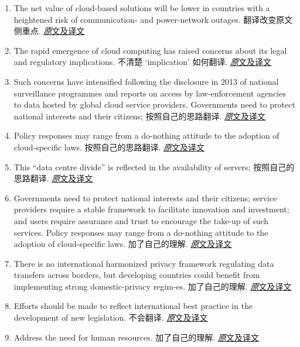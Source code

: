 \documentclass[a4paper, UTF8, 12pt]{article}
\begin{document}
\begin{enumerate}
    \item The net value of cloud-based solutions will be lower in countries with a heightened risk of communication- and power-network outages. 翻译改变原文侧重点. \hyperlink{par:01}{\underline{\emph 原文及译文}}
    \item The rapid emergence of cloud computing has raised concerns about its legal and regulatory implications. 不清楚 `implication' 如何翻译. \hyperlink{par:02}{\underline{\emph 原文及译文}}
    \item Such concerns have intensified following the disclosure in 2013 of national surveillance programmes and reports on access by law-enforcement agencies to data hosted by global cloud service providers. Governments need to protect national interests and their citizens; 按照自己的思路翻译. \hyperlink{par:02}{\underline{\emph 原文及译文}}
    \item Policy responses may range from a do-nothing attitude to the adoption of cloud-specific laws. 按照自己的思路翻译. \hyperlink{par:02}{\underline{\emph 原文及译文}}
    \item This “data centre divide” is reflected in the availability of servers; 按照自己的思路翻译. \hyperlink{par:01}{\underline{\emph 原文及译文}}
    \item Governments need to protect national interests and their citizens; service providers require a stable framework to facilitate innovation and investment; and users require assurance and trust to encourage the take-up of such services. Policy responses may range from a do-nothing attitude to the adoption of cloud-specific laws. 加了自己的理解. \hyperlink{par:02}{\underline{\emph 原文及译文}}
    \item There is no international harmonized privacy framework regulating data transfers across borders, but developing countries could benefit from implementing strong domestic-privacy regim-es. 加了自己的理解. \hyperlink{par:03}{\underline{\emph 原文及译文}}
    \item Efforts should be made to reflect international best practice in the development of new legislation. 不会翻译. \hyperlink{par:04}{\underline{\emph 原文及译文}}
    \item Address the need for human resources. 加了自己的理解. \hyperlink{par:05}{\underline{\emph 原文及译文}}

\end{enumerate}
\end{document}
